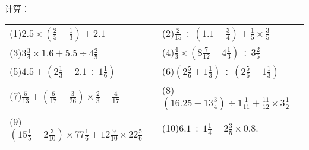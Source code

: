 
计算：\\
\begin{tabular}{ll}
	(1)$2.5 \times\left(\frac{2}{5}-\frac{1}{3}\right)+2.1$ \hspace{16em}  & 
	(2)$\frac{2}{15} \div\left(1.1-\frac{3}{4}\right)+\frac{1}{5} \times \frac{3}{5}$ \hspace{16em} \\
	(3)$3 \frac{3}{4} \times 1.6+5.5 \div 4 \frac{2}{5}$ \hspace{16em}  & 
	(4)$\frac{4}{3} \times\left(8 \frac{7}{12}-4 \frac{1}{3}\right) \div 3 \frac{2}{5}$ \hspace{16em} \\
	(5)$4.5+\left(2 \frac{1}{3}-2.1 \div 1 \frac{1}{6}\right)$ \hspace{16em}  & 
	(6)$\left(2 \frac{5}{6}+1 \frac{1}{3}\right) \div\left(2 \frac{5}{6}-1 \frac{1}{3}\right)$ \hspace{16em} \\
	(7)$\frac{5}{13}+\left(\frac{6}{17}-\frac{3}{26}\right) \times \frac{2}{3}-\frac{4}{17}$ \hspace{16em}  & 
	(8)$\left(16.25-13 \frac{3}{4}\right) \div 1 \frac{1}{11}+\frac{11}{12} \times 3 \frac{1}{2}$ \hspace{16em} \\
	(9)$\left(15 \frac{1}{5}-2 \frac{3}{10}\right) \times 77 \frac{1}{6}+12 \frac{9}{10} \times 22 \frac{5}{6}$ \hspace{16em}  & 
	(10)$6.1 \div 1 \frac{1}{4}-2 \frac{3}{5} \times 0.8$. \hspace{16em} \\
\end{tabular}

